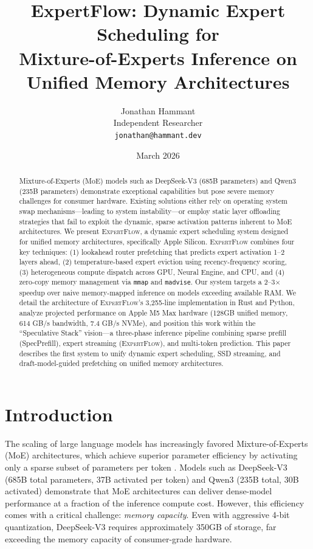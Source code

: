 \documentclass[11pt]{article}
\title{\textbf{ExpertFlow: Dynamic Expert Scheduling for\\
Mixture-of-Experts Inference on Unified Memory Architectures}}
\author{
    Jonathan Hammant \\
    Independent Researcher \\
    \texttt{jonathan@hammant.dev}
}
\date{March 2026}
\begin{document}
\maketitle

\begin{abstract}
Mixture-of-Experts (MoE) models such as DeepSeek-V3 (685B parameters) and Qwen3 (235B parameters) demonstrate exceptional capabilities but pose severe memory challenges for consumer hardware. Existing solutions either rely on operating system swap mechanisms—leading to system instability—or employ static layer offloading strategies that fail to exploit the dynamic, sparse activation patterns inherent to MoE architectures. We present \textsc{ExpertFlow}, a dynamic expert scheduling system designed for unified memory architectures, specifically Apple Silicon. \textsc{ExpertFlow} combines four key techniques: (1) lookahead router prefetching that predicts expert activation 1--2 layers ahead, (2) temperature-based expert eviction using recency-frequency scoring, (3) heterogeneous compute dispatch across GPU, Neural Engine, and CPU, and (4) zero-copy memory management via \texttt{mmap} and \texttt{madvise}. Our system targets a 2--3$\times$ speedup over naive memory-mapped inference on models exceeding available RAM. We detail the architecture of \textsc{ExpertFlow}'s 3,255-line implementation in Rust and Python, analyze projected performance on Apple M5 Max hardware (128GB unified memory, 614 GB/s bandwidth, 7.4 GB/s NVMe), and position this work within the ``Speculative Stack'' vision—a three-phase inference pipeline combining sparse prefill (SpecPrefill), expert streaming (\textsc{ExpertFlow}), and multi-token prediction. This paper describes the first system to unify dynamic expert scheduling, SSD streaming, and draft-model-guided prefetching on unified memory architectures.
\end{abstract}

\section{Introduction}

The scaling of large language models has increasingly favored Mixture-of-Experts (MoE) architectures, which achieve superior parameter efficiency by activating only a sparse subset of parameters per token \cite{fedus2022switch,deepseekv3,qwen3}. Models such as DeepSeek-V3 (685B total parameters, 37B activated per token) and Qwen3 (235B total, 30B activated) demonstrate that MoE architectures can deliver dense-model performance at a fraction of the inference compute cost. However, this efficiency comes with a critical challenge: \textit{memory capacity}. Even with aggressive 4-bit quantization, DeepSeek-V3 requires approximately 350GB of storage, far exceeding the memory capacity of consumer-grade hardware.
\end{document}
